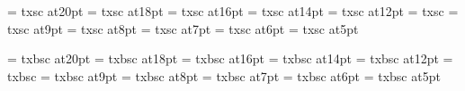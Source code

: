 \font\twentycaps=      txsc at20pt
\font\eighteencaps=    txsc at18pt
\font\sixteencaps=     txsc at16pt
\font\fourteencaps=    txsc at14pt
\font\twelvecaps=      txsc at12pt
\font\caps=            txsc  %
\font\ninecaps=        txsc at9pt
\font\eightcaps=       txsc at8pt
\font\sevencaps=       txsc at7pt
\font\sixcaps=         txsc at6pt
\font\fivecaps=        txsc at5pt

\font\twentycapsbf=      txbsc at20pt
\font\eighteencapsbf=    txbsc at18pt
\font\sixteencapsbf=     txbsc at16pt
\font\fourteencapsbf=    txbsc at14pt
\font\twelvecapsbf=      txbsc at12pt
\font\capsbf=            txbsc %
\font\ninecapsbf=        txbsc at9pt
\font\eightcapsbf=       txbsc at8pt
\font\sevencapsbf=       txbsc at7pt
\font\sixcapsbf=         txbsc at6pt
\font\fivecapsbf=        txbsc at5pt
\rm 